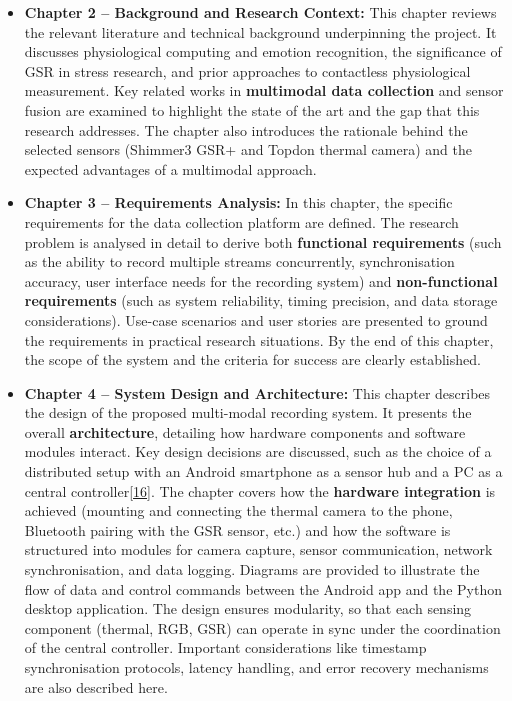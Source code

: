 \documentclass[12pt,a4paper]{article}
\begin{document}
\begin{itemize}
\item
  \textbf{Chapter 2 -- Background and Research Context:} This chapter reviews the relevant literature and technical background underpinning the project. It discusses physiological computing and emotion recognition, the significance of GSR in stress research, and prior approaches to contactless physiological measurement. Key related works in \textbf{multimodal data collection} and sensor fusion are examined to highlight the state of the art and the gap that this research addresses. The chapter also introduces the rationale behind the selected sensors (Shimmer3 GSR+ and Topdon thermal camera) and the expected advantages of a multimodal approach.
\item
  \textbf{Chapter 3 -- Requirements Analysis:} In this chapter, the specific requirements for the data collection platform are defined. The research problem is analysed in detail to derive both \textbf{functional requirements} (such as the ability to record multiple streams concurrently, synchronisation accuracy, user interface needs for the recording system) and \textbf{non-functional requirements} (such as system reliability, timing precision, and data storage considerations). Use-case scenarios and user stories are presented to ground the requirements in practical research situations. By the end of this chapter, the scope of the system and the criteria for success are clearly established.
\item
  \textbf{Chapter 4 -- System Design and Architecture:} This chapter describes the design of the proposed multi-modal recording system. It presents the overall \textbf{architecture}, detailing how hardware components and software modules interact. Key design decisions are discussed, such as the choice of a distributed setup with an Android smartphone as a sensor hub and a PC as a central controller\href{AndroidApp/README.md\#L2-L5}{{[}16{]}}. The chapter covers how the \textbf{hardware integration} is achieved (mounting and connecting the thermal camera to the phone, Bluetooth pairing with the GSR sensor, etc.) and how the software is structured into modules for camera capture, sensor communication, network synchronisation, and data logging. Diagrams are provided to illustrate the flow of data and control commands between the Android app and the Python desktop application. The design ensures modularity, so that each sensing component (thermal, RGB, GSR) can operate in sync under the coordination of the central controller. Important considerations like timestamp synchronisation protocols, latency handling, and error recovery mechanisms are also described here.

\end{itemize}
\end{document}
